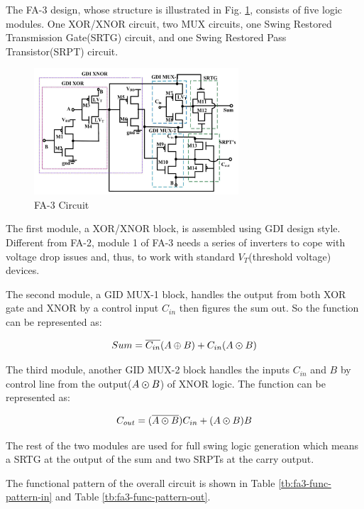 \documentclass[conference]{IEEEtran}
\begin{document}
The FA-3 \cite{18743001} design, whose structure is illustrated in Fig. \ref{fig:fa3-circuit}, consists of five logic modules.
One XOR/XNOR circuit, two MUX circuits, one Swing Restored Transmission Gate(SRTG) circuit, and one Swing Restored Pass Transistor(SRPT) circuit.

\begin{figure}[!hb]
	\centering
	\includegraphics[width=3in]{fa3-circuit.png}
	\caption{FA-3 Circuit}
	\label{fig:fa3-circuit}
\end{figure}

The first module, a XOR/XNOR block, is assembled using GDI design style.
Different from FA-2, module 1 of FA-3 needs a series of inverters to cope with voltage drop issues and, thus, to work with standard \(V_T\)(threshold voltage) devices.

The second module, a GID MUX-1 block, handles the output from both XOR gate and XNOR by a control input \(C_{in}\) then figures the sum out.
So the function can be represented as:

\[
	Sum = \overline{C_{in}}(A \oplus B) + C_{in}(A \varodot B)
\]

The third module, another GID MUX-2 block handles the inputs \(C_{in}\) and \(B\) by control line from the output(\(A \varodot B\)) of XNOR logic.
The function can be represented as:

\[
	C_{out} = (\overline{A \varodot B})C_{in} + (A \varodot B)B
\]

The rest of the two modules are used for full swing logic generation which means a SRTG at the output of the sum and two SRPTs at the carry output.

The functional pattern of the overall circuit is shown in Table \ref{tb:fa3-func-pattern-in} and Table \ref{tb:fa3-func-pattern-out}.
\end{document}
